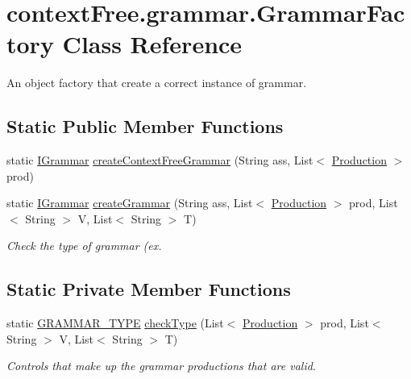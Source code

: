 \hypertarget{classcontext_free_1_1grammar_1_1_grammar_factory}{\section{context\-Free.\-grammar.\-Grammar\-Factory Class Reference}
\label{classcontext_free_1_1grammar_1_1_grammar_factory}
}


An object factory that create a correct instance of grammar.  


\subsection*{Static Public Member Functions}
\begin{DoxyCompactItemize}
\item 
static \hyperlink{interfacecontext_free_1_1grammar_1_1_i_grammar}{I\-Grammar} \hyperlink{classcontext_free_1_1grammar_1_1_grammar_factory_a6829a8d168584b20ac594fae87de591a}{create\-Context\-Free\-Grammar} (String ass, List$<$ \hyperlink{classcontext_free_1_1grammar_1_1_production}{Production} $>$ prod)
\item 
static \hyperlink{interfacecontext_free_1_1grammar_1_1_i_grammar}{I\-Grammar} \hyperlink{classcontext_free_1_1grammar_1_1_grammar_factory_a25d4e5bf4a9a452efca5dd6518e16c25}{create\-Grammar} (String ass, List$<$ \hyperlink{classcontext_free_1_1grammar_1_1_production}{Production} $>$ prod, List$<$ String $>$ V, List$<$ String $>$ T)
\begin{DoxyCompactList}\small\item\em Check the type of grammar (ex. \end{DoxyCompactList}\end{DoxyCompactItemize}
\subsection*{Static Private Member Functions}
\begin{DoxyCompactItemize}
\item 
static \hyperlink{enumcontext_free_1_1grammar_1_1_g_r_a_m_m_a_r___t_y_p_e}{G\-R\-A\-M\-M\-A\-R\-\_\-\-T\-Y\-P\-E} \hyperlink{classcontext_free_1_1grammar_1_1_grammar_factory_a513482168bb15e55211bc4f04e276711}{check\-Type} (List$<$ \hyperlink{classcontext_free_1_1grammar_1_1_production}{Production} $>$ prod, List$<$ String $>$ V, List$<$ String $>$ T)
\begin{DoxyCompactList}\small\item\em Controls that make up the grammar productions that are valid. \end{DoxyCompactList}\end{DoxyCompactItemize}


